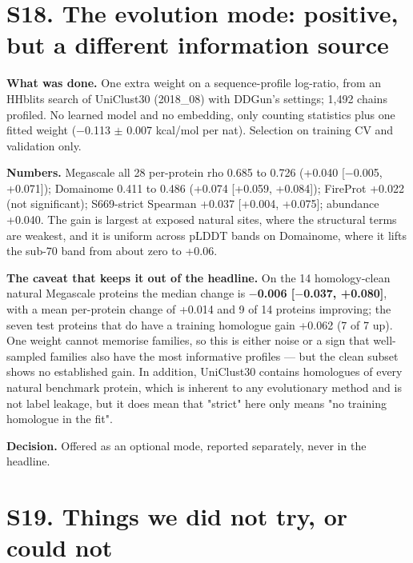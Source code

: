 \documentclass[11pt,a4paper]{article}
\begin{document}
\section{S18. The evolution mode: positive, but a different information source}

\textbf{What was done.} One extra weight on a sequence-profile log-ratio, from an HHblits search of UniClust30
(2018\_08) with DDGun's settings; 1,492 chains profiled. No learned model and no embedding, only counting
statistics plus one fitted weight ($-$0.113 $\pm$ 0.007 kcal/mol per nat). Selection on training CV and validation
only.

\textbf{Numbers.} Megascale all 28 per-protein rho 0.685 to 0.726 (+0.040 [$-$0.005, +0.071]); Domainome 0.411 to 0.486
(+0.074 [+0.059, +0.084]); FireProt +0.022 (not significant); S669-strict Spearman +0.037 [+0.004, +0.075];
abundance +0.040. The gain is largest at exposed natural sites, where the structural terms are weakest, and it
is uniform across pLDDT bands on Domainome, where it lifts the sub-70 band from about zero to +0.06.

\textbf{The caveat that keeps it out of the headline.} On the 14 homology-clean natural Megascale proteins the median
change is \textbf{$-$0.006 [$-$0.037, +0.080]}, with a mean per-protein change of +0.014 and 9 of 14 proteins improving;
the seven test proteins that do have a training homologue gain +0.062 (7 of 7 up). One weight cannot memorise
families, so this is either noise or a sign that well-sampled families also have the most informative profiles ---
but the clean subset shows no established gain. In addition, UniClust30 contains homologues of every natural
benchmark protein, which is inherent to any evolutionary method and is not label leakage, but it does mean that
"strict" here only means "no training homologue in the fit".

\textbf{Decision.} Offered as an optional mode, reported separately, never in the headline.



\section{S19. Things we did not try, or could not}
\end{document}
